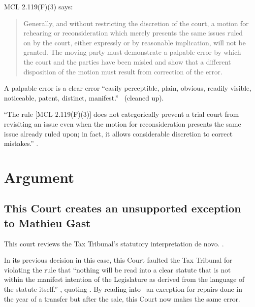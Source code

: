 \documentclass[12pt,\documentclassflag]{michiganCourtOfAppealsBrief}
\begin{document}
MCL 2.119(F)(3) says:

\begin{quote}
  Generally, and without restricting the discretion of the court, a motion for rehearing or reconsideration which merely presents the same issues ruled on by the court, either expressly or by reasonable implication, will not be granted. The moving party must demonstrate a palpable error by which the court and the parties have been misled and show that a different disposition of the motion must result from correction of the error.
\end{quote}

 A palpable error is a clear error ``easily perceptible, plain, obvious, readily
 visible, noticeable, patent, distinct, manifest.'' \ (cleaned up).
 

``The rule [MCL 2.119(F)(3)] does not categorically prevent a trial court from revisiting an issue even when the motion for reconsideration presents the same issue already ruled upon; in fact, it allows considerable discretion to correct mistakes.'' . 

\section{Argument}




\subsection{This Court creates an unsupported exception to Mathieu Gast}

This court reviews the Tax Tribunal's statutory interpretation de novo. .

In its previous decision in this case, this Court faulted the Tax Tribunal for violating the rule that ``nothing will be read into a clear statute that is not within the manifest intention of the Legislature as derived from the language of the statute itself.'' , quoting . By reading into \mathieuGast\ an exception for repairs done in the year of a transfer but after the sale, this Court now makes the same error.
\end{document}
